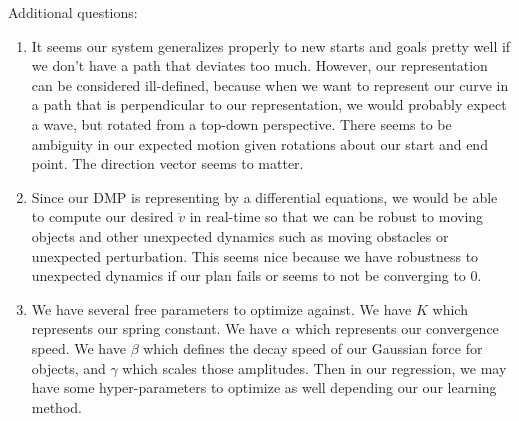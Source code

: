 \documentclass[12pt]{article}
\begin{document}
Additional questions:
\begin{enumerate}
	\item It seems our system generalizes properly to new starts and goals pretty well if we don't have a path that deviates too much. However, our representation can be considered ill-defined, because when we want to represent our curve in a path that is perpendicular to our representation, we would probably expect a wave, but rotated from a top-down perspective. There seems to be ambiguity in our expected motion given rotations about our start and end point. The direction vector seems to matter.
	\item Since our DMP is representing by a differential equations, we would be able to compute our desired $\dot{v}$ in real-time so that we can be robust to moving objects and other unexpected dynamics such as moving obstacles or unexpected perturbation. This seems nice because we have robustness to unexpected dynamics if our plan fails or seems to not be converging to 0.
	\item We have several free parameters to optimize against. We have $K$ which represents our spring constant. We have $\alpha$ which represents our convergence speed. We have $\beta$ which defines the decay speed of our Gaussian force for objects, and $\gamma$ which scales those amplitudes. Then in our regression, we may have some hyper-parameters to optimize as well depending our our learning method.
\end{enumerate}
\end{document}

